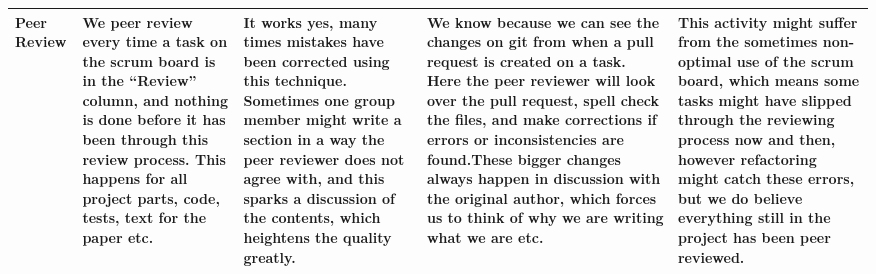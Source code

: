\begin{sidewaystable}[]
\begin{tabularx}{\textwidth}{|l|X|X|X|X|}
Peer Review      & We peer review every time a task on the scrum board is in the “Review” column, and nothing is done before it has been through this review process. This happens for all project parts, code, tests, text for the paper etc. & It works yes, many times mistakes have been corrected using this technique. Sometimes one group member might write a section in a way the peer reviewer does not agree with, and this sparks a discussion of the contents, which heightens the quality greatly. & We know because we can see the changes on git from when a pull request is created on a task. Here the peer reviewer will look over the pull request, spell check the files, and make corrections if errors or inconsistencies are found.These bigger changes always happen in discussion with the original author, which forces us to think of why we are writing what we are etc. & This activity might suffer from the sometimes non-optimal use of the scrum board, which means some tasks might have slipped through the reviewing process now and then, however refactoring might catch these errors, but we do believe everything still in the project has been peer reviewed. \\ \hline
\end{tabularx}
\end{sidewaystable}